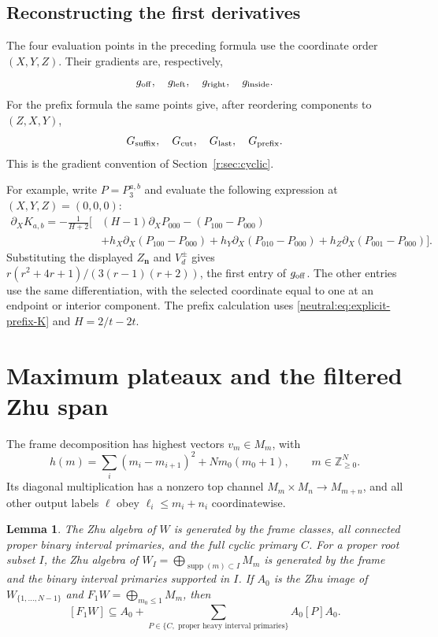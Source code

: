 \documentclass[11pt,a4paper]{article}
\numberwithin{equation}{section}
\newtheorem{lemma}[theorem]{Lemma}
\theoremstyle{definition}\newtheorem{definition}[theorem]{Definition}
\theoremstyle{remark}\newtheorem{remark}[theorem]{Remark}
\begin{document}
\subsection{Reconstructing the first derivatives}
\label{app:jet-map}
The four evaluation points in the preceding formula use the
coordinate order $(X,Y,Z)$. Their gradients are, respectively,
\[
 g_{\rm off},\quad g_{\rm left},\quad g_{\rm right},\quad g_{\rm inside}.
\]
For the prefix formula the same points give, after reordering
components to $(Z,X,Y)$,
\[
 G_{\rm suffix},\quad G_{\rm cut},\quad G_{\rm last},\quad G_{\rm prefix}.
\]
This is the gradient convention of Section~\ref{r:sec:cyclic}.

For example, write $P=P_3^{a,b}$ and evaluate the following
expression at $(X,Y,Z)=(0,0,0)$:
\begin{align*}
 \partial_XK_{a,b}=-\frac1{H+2}\big[&
 (H-1)\partial_XP_{000}-(P_{100}-P_{000})\\
 &+h_X\partial_X(P_{100}-P_{000})
 +h_Y\partial_X(P_{010}-P_{000})
 +h_Z\partial_X(P_{001}-P_{000})\big].
\end{align*}
Substituting the displayed $Z_{\mathbf n}$ and $V_d^\pm$ gives
$r(r^2+4r+1)/(3(r-1)(r+2))$, the first entry of $g_{\rm off}$.
The other entries use the same differentiation, with the selected
coordinate equal to one at an endpoint or interior component.
The prefix calculation uses
\eqref{neutral:eq:explicit-prefix-K} and $H=2/t-2t$.
\section{Maximum plateaux and the filtered Zhu span}
\label{app:maximum-plateaux}
\label{neutral:app:filtered-spanning}

The frame decomposition has highest vectors $v_m\in M_m$, with
\[
 h(m)=\sum_i(m_i-m_{i+1})^2+Nm_0(m_0+1),
                         \qquad m\in\mathbb Z_{\geq0}^N.
\]
Its diagonal multiplication has a nonzero top channel $M_m\times
M_n\to M_{m+n}$, and all other output labels $\ell$ obey
$\ell_i\leq m_i+n_i$ coordinatewise.

\begin{lemma}\label{neutral:lem:binary-Zhu-generation}
The Zhu algebra of $W$ is generated by the frame classes, all
connected proper binary interval primaries, and the full cyclic
primary $C$.  For a proper root subset $I$, the Zhu algebra of
$W_I=\bigoplus_{\operatorname{supp}(m)\subset I}M_m$ is generated by
the frame and the binary interval primaries supported in $I$.
If $A_0$ is the Zhu image of $W_{\{1,\ldots,N-1\}}$ and
$F_1W=\bigoplus_{m_0\leq1}M_m$, then
\[
 [F_1W]\subseteq A_0+
 \sum_{P\in\{C,\text{ proper heavy interval primaries}\}}A_0[P]A_0.
\]
\end{lemma}
\end{document}
